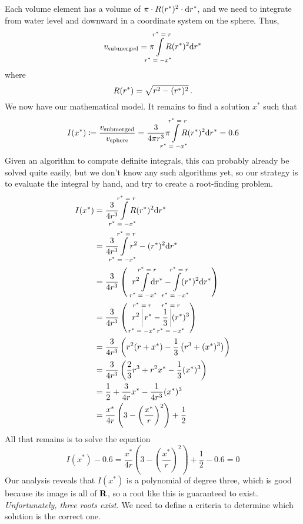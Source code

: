 \documentclass[12pt]{article}
\begin{document}
\begin{multicols}{2}
Each volume element has a volume of $\pi \cdot R(r^*)^2 \cdot \mathrm{d} r^*$,
and we need to integrate from water level and downward in a
coordinate system on the sphere.
Thus,
\begin{equation}
    v_\text{submerged} =
        \pi \int\limits_{\mathclap{r^* = -x^*}}^{\mathclap{r^* = r}}R(r^*)^2 \D r^*
\end{equation}
where
\[
    R(r^*) = \sqrt{r^2 - (r^*)^2} \,\text.
\]
We now have our mathematical model.
It remains to find a solution $x^*$ such that
\[
    I(x^*) \coloneqq \frac{v_\text{submerged}}{v_\text{sphere}}
    = \frac{3}{4 \pi r^3}
        \pi \int\limits_{\mathclap{r^* = -x^*}}^{\mathclap{r^* = r}}R(r^*)^2 \D r^*
    = 0.6
\]
Given an algorithm to compute definite integrals, this can probably already be
solved quite easily, but we don't know any such algorithms yet,
so our strategy is to evaluate the integral by hand, and try
to create a root-finding problem.
\begin{align*}
    I(x^*) &= \frac{3}{4 r^3}
        \int\limits_{\mathclap{r^* = -x^*}}^{\mathclap{r^* = r}}R(r^*)^2 \D r^* \\
    &= \frac{3}{4 r^3}
        \int\limits_{\mathclap{r^* = -x^*}}^{\mathclap{r^* = r}}
            r^2 - (r^*)^2 \D r^* \\
    &= \frac{3}{4 r^3} \left(\;\; %
        r^2\int\limits_{\mathclap{r^* = -x^*}}^{\mathclap{r^* = r}}
            \D r^*
            -
        \int\limits_{\mathclap{r^* = -x^*}}^{\mathclap{r^* = r}}
            (r^*)^2\D r^*
    \right) \\
    &= \frac{3}{4 r^3} \left(\;\; %
    r^2\Sub\limits_{\mathclap{r^* = -x^*}}^{\mathclap{r^* = r}}r^*
    -
    \frac{1}{3}\Sub\limits_{\mathclap{r^* = -x^*}}^{\mathclap{r^* = r}}
        (r^*)^3
    \right) \\
    &= \frac{3}{4 r^3} \left(
    r^2(r + x^*) - \frac{1}{3}\left(r^3 + (x^*)^3\right)
    \right) \\
    &= \frac{3}{4 r^3} \left(
    \frac{2}{3} r^3 + r^2x^* - \frac{1}{3}(x^*)^3
    \right) \\
    &= \frac{1}{2} + \frac{3}{4r}x^* - \frac{1}{4 r^3} (x^*)^3 \\
    &= \frac{x^*}{4r} \left(
    3 - \left(\frac{x^*}{r}\right)^2
    \right) + \frac{1}{2}
\end{align*}
All that remains is to solve the equation
\[
    I(x^*) - 0.6 = \frac{x^*}{4r} \left(
    3 - \left(\frac{x^*}{r}\right)^2
    \right) + \frac{1}{2} - 0.6 = 0
\]
Our analysis reveals that $I(x^*)$ is a polynomial of degree three,
which is good because its image is all of $\mathbf{R}$, so a root like this is guaranteed
to exist. {\em Unfortunately, three roots exist.}
We need to define a criteria to determine which solution is the correct one.


\end{multicols}
\end{document}
